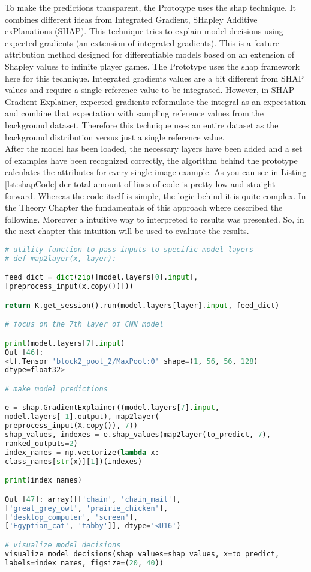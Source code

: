 To make the predictions transparent, the Prototype uses the shap technique. It combines different ideas from Integrated Gradient, SHapley Additive exPlanations (SHAP). This technique tries to explain model decisions using expected gradients (an extension of integrated gradients). This is a feature attribution method designed for differentiable models based on an extension of Shapley values to infinite player games. The Prototype uses the shap framework here for this technique.
Integrated gradients values are a bit different from SHAP values and require a single reference value to be integrated. However, in SHAP Gradient Explainer, expected gradients reformulate the integral as an expectation and combine that expectation with sampling reference values from the background dataset. Therefore this technique uses an entire dataset as the background distribution versus just a single reference value.\\

After the model has been loaded, the necessary layers have been added and a set of examples have been recognized correctly, the algorithm behind the prototype calculates the attributes for every single image example. As you can see in Listing \ref{lst:shapCode} der total amount of lines of code is pretty low and straight forward. Whereas the code itself is simple, the logic behind it is quite complex. In the Theory Chapter the fundamentals of this approach where described the following. Moreover a intuitive way to interpreted to results was presented. So, in the next chapter this intuition will be used to evaluate the results.

\begin{lstlisting}[captionpos=b,label={lst:shapCode}, float=tb,language=Python, caption= asadd]
# utility function to pass inputs to specific model layers
# def map2layer(x, layer):

feed_dict = dict(zip([model.layers[0].input], 
[preprocess_input(x.copy())]))

return K.get_session().run(model.layers[layer].input, feed_dict)

# focus on the 7th layer of CNN model

print(model.layers[7].input)
Out [46]:
<tf.Tensor 'block2_pool_2/MaxPool:0' shape=(1, 56, 56, 128)
dtype=float32>

# make model predictions

e = shap.GradientExplainer((model.layers[7].input,
model.layers[-1].output), map2layer(
preprocess_input(X.copy()), 7))
shap_values, indexes = e.shap_values(map2layer(to_predict, 7),
ranked_outputs=2)
index_names = np.vectorize(lambda x:
class_names[str(x)][1])(indexes)

print(index_names)

Out [47]: array([['chain', 'chain_mail'],
['great_grey_owl', 'prairie_chicken'],
['desktop_computer', 'screen'],
['Egyptian_cat', 'tabby']], dtype='<U16')

# visualize model decisions
visualize_model_decisions(shap_values=shap_values, x=to_predict, 
labels=index_names, figsize=(20, 40))
\end{lstlisting}




